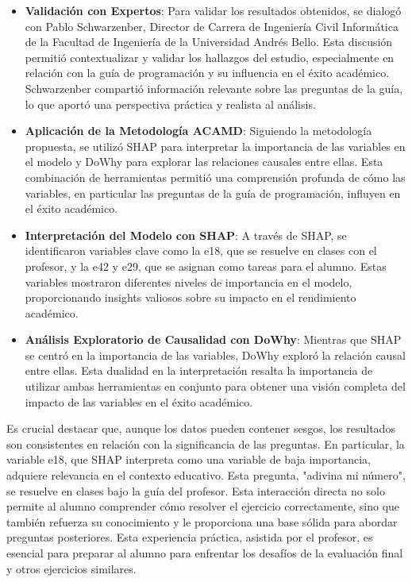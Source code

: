 \begin{itemize}
    \item \textbf{Validación con Expertos}: Para validar los resultados obtenidos, se dialogó con Pablo Schwarzenber, Director de Carrera de Ingeniería Civil Informática de la Facultad de Ingeniería de la Universidad Andrés Bello. Esta discusión permitió contextualizar y validar los hallazgos del estudio, especialmente en relación con la guía de programación y su influencia en el éxito académico. Schwarzenber compartió información relevante sobre las preguntas de la guía, lo que aportó una perspectiva práctica y realista al análisis.
    \item \textbf{Aplicación de la Metodología ACAMD}: Siguiendo la metodología propuesta, se utilizó SHAP para interpretar la importancia de las variables en el modelo y DoWhy para explorar las relaciones causales entre ellas. Esta combinación de herramientas permitió una comprensión profunda de cómo las variables, en particular las preguntas de la guía de programación, influyen en el éxito académico.
    \item \textbf{Interpretación del Modelo con SHAP}: A través de SHAP, se identificaron variables clave como la e18, que se resuelve en clases con el profesor, y la e42 y e29, que se asignan como tareas para el alumno. Estas variables mostraron diferentes niveles de importancia en el modelo, proporcionando insights valiosos sobre su impacto en el rendimiento académico.
    \item \textbf{Análisis Exploratorio de Causalidad con DoWhy}: Mientras que SHAP se centró en la importancia de las variables, DoWhy exploró la relación causal entre ellas. Esta dualidad en la interpretación resalta la importancia de utilizar ambas herramientas en conjunto para obtener una visión completa del impacto de las variables en el éxito académico.
\end{itemize}

Es crucial destacar que, aunque los datos pueden contener sesgos, los resultados son consistentes en relación con la significancia de las preguntas. En particular, la variable e18, que SHAP interpreta como una variable de baja importancia, adquiere relevancia en el contexto educativo. Esta pregunta, "adivina mi número", se resuelve en clases bajo la guía del profesor. Esta interacción directa no solo permite al alumno comprender cómo resolver el ejercicio correctamente, sino que también refuerza su conocimiento y le proporciona una base sólida para abordar preguntas posteriores. Esta experiencia práctica, asistida por el profesor, es esencial para preparar al alumno para enfrentar los desafíos de la evaluación final y otros ejercicios similares.

